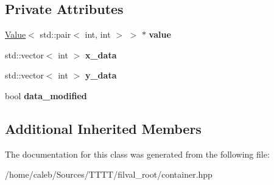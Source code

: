 \subsection*{Private Attributes}
\begin{DoxyCompactItemize}
\item 
\hypertarget{classfilval_1_1root_1_1ContainerTGraph_a4658d510335e6ba7e0589f86610a112f}{}\label{classfilval_1_1root_1_1ContainerTGraph_a4658d510335e6ba7e0589f86610a112f} 
\hyperlink{classfilval_1_1Value}{Value}$<$ std\+::pair$<$ int, int $>$ $>$ $\ast$ {\bfseries value}
\item 
\hypertarget{classfilval_1_1root_1_1ContainerTGraph_acea5add5cabd7c194722d0e11c24391d}{}\label{classfilval_1_1root_1_1ContainerTGraph_acea5add5cabd7c194722d0e11c24391d} 
std\+::vector$<$ int $>$ {\bfseries x\+\_\+data}
\item 
\hypertarget{classfilval_1_1root_1_1ContainerTGraph_ae963e6d08c3965c1da75a1c8fb7c0cc5}{}\label{classfilval_1_1root_1_1ContainerTGraph_ae963e6d08c3965c1da75a1c8fb7c0cc5} 
std\+::vector$<$ int $>$ {\bfseries y\+\_\+data}
\item 
\hypertarget{classfilval_1_1root_1_1ContainerTGraph_a9b0025f6db829cb28f057e96ee3e2f02}{}\label{classfilval_1_1root_1_1ContainerTGraph_a9b0025f6db829cb28f057e96ee3e2f02} 
bool {\bfseries data\+\_\+modified}
\end{DoxyCompactItemize}
\subsection*{Additional Inherited Members}


The documentation for this class was generated from the following file\+:\begin{DoxyCompactItemize}
\item 
/home/caleb/\+Sources/\+T\+T\+T\+T/filval\+\_\+root/container.\+hpp\end{DoxyCompactItemize}
